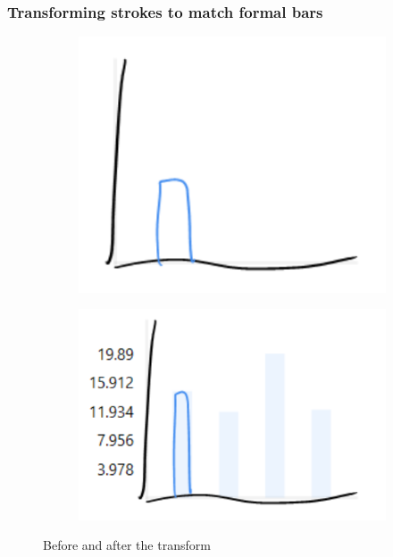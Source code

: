 	\subsubsection{Transforming strokes to match formal bars}
	\begin{figure}[h]
		\centering
		\begin{subfigure}[b]{0.35\textwidth}
			\includegraphics[width=\textwidth]{sketchtransform1}
		\end{subfigure}
		\begin{subfigure}[b]{0.4\textwidth}
			\includegraphics[width=\textwidth]{sketchtransform2}
		\end{subfigure}
		\caption{Before and after the transform}
	\end{figure}		
	
